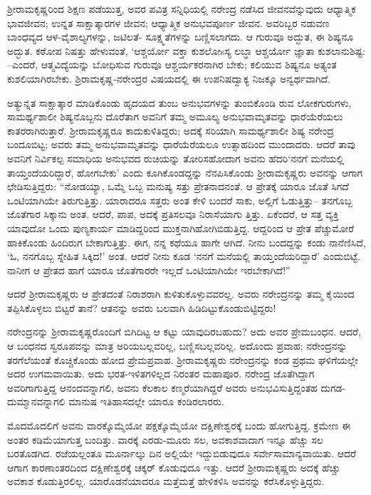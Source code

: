 ಶ್ರೀರಾಮಕೃಷ್ಣರಿಂದ ಶಿಕ್ಷಣ ಪಡೆಯುತ್ತ, ಅವರ ಪವಿತ್ರ ಸನ್ನಿಧಿಯಲ್ಲಿ ನರೇಂದ್ರ ನಡೆಸಿದ ಜೀವನವೆನ್ನುವುದು ಆಧ್ಯಾತ್ಮಿಕ ಭಾವಜೀವನ; ಉನ್ನತ ಸಾಕ್ಷಾತ್ಕಾರಗಳ ಜೀವನ; ಆಧ್ಯಾತ್ಮಿಕ ಅನುಭವಪೂರ್ಣ ಜೀವನ. ಅವರಿಬ್ಬರ ನಡುವಣ ಬಾಂಧವ್ಯದ ಆಳ-ವೈಶಾಲ್ಯಗಳನ್ನು, ಜಟಿಲತೆ- ಸೂಕ್ಷ್ಮತೆಗಳನ್ನು ಬಣ್ಣಿಸಲಾಗದು. ಆ ಗುರುವೂ ಅದ್ಭುತ, ಈ ಶಿಷ್ಯನೂ ಅದ್ಭುತ. ಕಠೋಪ ನಿಷತ್ತು ಹೇಳುವಂತೆ, ‘ಆಶ್ಚರ್ಯೋ ವಕ್ತಾ ಕುಶಲೋsಸ್ಯ ಲಬ್ಧಾ ಆಶ್ಚರ್ಯೋ ಜ್ಞಾತಾ ಕುಶಲಾನುಶಿಷ್ಟ: –ಎಂದರೆ, ಆತ್ಮವಿದ್ಯೆಯನ್ನು ಬೋಧಿಸುವ ಗುರುವೂ ಆಶ್ಚರ್ಯಕರನಾಗಿರ ಬೇಕು; ಕಲಿಯುವ ಶಿಷ್ಯನೂ ಅತ್ಯಂತ ಕುಶಲಿಯಾಗಿರಬೇಕು. ಶ್ರಿರಾಮಕೃಷ್ಣ-ನರೇಂದ್ರರ ವಿಷಯದಲ್ಲಿ ಈ ಉಪನಿಷದ್ವಾಕ್ಯ ನಿಜಕ್ಕೂ ಅನ್ವರ್ಥವಾಗಿದೆ.

ಅತ್ಯುನ್ನತ ಸಾಕ್ಷಾತ್ಕಾರ ಮಾಡಿಕೊಂಡು ಹೃದಯದ ತುಂಬ ಅನುಭವಗಳನ್ನು ತುಂಬಿಕೊಂಡಿ ರುವ ಲೋಕಗುರುಗಳು, ಸಾಮರ್ಥ್ಯಶಾಲೀ ಶಿಷ್ಯನೊಬ್ಬನು ದೊರೆತಾಗ ಅವನಿಗೆ ತಮ್ಮ ಅಮೂಲ್ಯ ಅನುಭವಾಮೃತವನ್ನು ಧಾರೆಯೆರೆಯಲು ಕಾತರರಾಗಿರುತ್ತಾರೆ. ಶ್ರೀರಾಮಕೃಷ್ಣರೂ ಕಾದುಕುಳಿತಿದ್ದರು; ಅದಕ್ಕೆ ಸರಿಯಾಗಿ ಸಾಮರ್ಥ್ಯಶಾಲೀ ಶಿಷ್ಯ ನರೇಂದ್ರ ಬಂದೂಬಿಟ್ಟ; ಅವರು ತಮ್ಮ ಅನುಭವಾಮೃತವನ್ನು ಧಾರೆಯೆರೆಯಲೂ ಉತ್ಸಾಹದಿಂದ ಮುಂದಾದರು. ಆದರೆ ತಾವು ಅವನಿಗೆ ನಿರ್ವಿಕಲ್ಪ ಸಮಾಧಿಯ ಅನುಭವದ ರುಚಿಯನ್ನು ತೋರಿಸಹೋದಾಗ ಅವನು ಹೆದರಿ‘ನನಗೆ ಮನೆಯಲ್ಲಿ ತಾಯ್ತಂದೆಯರಿದ್ದಾರೆ, ಹೋಗಬೇಕು’ ಎಂದು ಕೂಗಿಕೊಂಡದ್ದನ್ನು ನೆನಪಿಸಿಕೊಂಡು ಶ್ರೀರಾಮಕೃಷ್ಣರು ಅವನನ್ನು ಆಗಾಗ ಛೇಡಿಸುತ್ತಿದ್ದರು: “ನೋಡಯ್ಯಾ, ಒಮ್ಮೆ ಒಬ್ಬ ಮನುಷ್ಯ ಸತ್ತು ಪ್ರೇತನಾದನಂತೆ. ಆ ಪ್ರೇತಕ್ಕೆ ಯಾರೂ ಜೊತೆ ಸಿಗದೆ ಒಂಟಿಯಾಗಿಯೇ ತಿರುಗುತ್ತಿತ್ತು. ಯಾರಾದರೂ ಸತ್ತರು ಅಂತ ಕೇಳಿ ಬಂದರೆ ಸಾಕು, ಅಲ್ಲಿಗೆ ಓಡುತ್ತಿತ್ತು– ತನಗೊಬ್ಬ ಜೊತೆಗಾರ ಸಿಕ್ಕಾನು ಅಂತ. ಆದರೆ, ಪಾಪ, ಅದಕ್ಕೆ ಪ್ರತಿಸಲವೂ ನಿರಾಸೆಯಾಗು ತ್ತಿತ್ತು. ಏಕೆಂದರೆ, ಆ ಸತ್ತ ವ್ಯಕ್ತಿ ಯಾವುದೋ ಒಂದು ಪುಣ್ಯಕಾರ್ಯ ಮಾಡಿದ್ದರಿಂದ ಮುಕ್ತನಾಗಿಹೋಗಿಬಿಡುತ್ತಿದ್ದ. ಆದ್ದರಿಂದ ಆ ಪ್ರೇತ ಪೆಚ್ಚುಮೋರೆ ಹಾಕಿಕೊಂಡು ಹಿಂದಿರುಗ ಬೇಕಾಗುತ್ತಿತ್ತು. ಈಗ, ನನ್ನ ಕಥೆಯೂ ಹಾಗೇ ಆಗಿದೆ. ನೀನು ಬಂದದ್ದನ್ನು ಕಂಡು ನಾನೆಣಿಸಿದೆ, ‘ಓ, ನನಗೊಬ್ಬ ಸ್ನೇಹಿತ ಸಿಕ್ಕಿದ!’ ಅಂತ. ಆದರೆ ನೀನು ಕೂಡ ‘ನನಗೆ ಮನೆಯಲ್ಲಿ ತಾಯ್ತಂದೆಯರಿದ್ದಾರೆ’ ಎಂದುಬಿಟ್ಟೆ. ನಾನೀಗ ಆ ಪ್ರೇತದ ಹಾಗೆ ಯಾರೂ ಜೊತೆಗಾರರೇ ಇಲ್ಲದೆ ಒಂಟಿಯಾಗಿಯೇ ಇರಬೇಕಾಗಿದೆ!”

ಆದರೆ ಶ್ರೀರಾಮಕೃಷ್ಣರು ಆ ಪ್ರೇತದಂತೆ ನಿರಾಶರಾಗಿ ಕುಳಿತುಕೊಳ್ಳುವವರಲ್ಲ. ಅವರು ನರೇಂದ್ರನನ್ನು ತಮ್ಮ ಕೈಯಿಂದ ತಪ್ಪಿಸಿಕೊಳ್ಳಲು ಬಿಟ್ಟರೆ ತಾನೆ? ಆತನನ್ನು ಅವರು ಬಲವಾಗಿ ಹಿಡಿದಿಟ್ಟುಕೊಂಡುಬಿಟ್ಟಿದ್ದರು!

ನರೇಂದ್ರನನ್ನು ಶ್ರೀರಾಮಕೃಷ್ಣರೊಂದಿಗೆ ಬಿಗಿದಿಟ್ಟ ಆ ಕಟ್ಟು ಯಾವುದಿರಬಹುದು? ಅದು ಅವರ ಪ್ರೇಮಬಂಧನ. ಆದರೆ, ಆ ಬಂಧನದ ಸ್ವರೂಪವನ್ನು ಮಾತ್ರ ಅರಿಯಬಲ್ಲವರಿಲ್ಲ, ಬಣ್ಣಿಸಬಲ್ಲವರಿಲ್ಲ. ಅದೊಂದು ಪ್ರವಾಹ; ನರೇಂದ್ರನನ್ನು ತರಗೆಲೆಯಂತೆ ಕೊಚ್ಚಿಕೊಂಡು ಹೋದ ಪ್ರೇಮಪ್ರವಾಹ. ಶ್ರೀರಾಮಕೃಷ್ಣರು ನರೇಂದ್ರನನ್ನು ಕಂಡ ಪ್ರಥಮ ಘಳಿಗೆಯಲ್ಲೇ ಅದರ ಉಗಮವಾಯಿತು. ಅದು ಭರತ-ಇಳಿತಗಳಿಲ್ಲದ ನಿರಂತರ ಮಹಾಪೂರ. ನರೇಂದ್ರ ಜೊತೆಗಿದ್ದಾಗ ಅವರಿಗಾಗುತ್ತಿದ್ದ ಆನಂದವನ್ನಾಗಲಿ, ಅವನು ಕೆಲಕಾಲ ಕಣ್ಮರೆಯಾಗಿದ್ದರೆ ಅವರು ಅನುಭವಿಸುತ್ತಿದ್ದಂತಹ ದುಗಡ-ದುಮ್ಮಾನವನ್ನಾಗಲಿ ಮಾನುಷ ಇತಿಹಾಸದಲ್ಲೇ ಯಾರೂ ಕಂಡಿರಲಾರರು.

ಮೊದಮೊದಲಿಗೆ ಅವನು ವಾರಕ್ಕೊಮ್ಮೆಯೋ ಪಕ್ಷಕ್ಕೊಮ್ಮೆಯೋ ದಕ್ಷಿಣೇಶ್ವರಕ್ಕೆ ಬಂದು ಹೋಗುತ್ತಿದ್ದ. ಕ್ರಮೇಣ ಈ ಅಂತರ ಕಡಿಮೆಯಾಗುತ್ತ ಬಂದಿತ್ತು. ವಾರಕ್ಕೆ ಎರಡು-ಮೂರು ಸಲ, ಅವಕಾಶವಾದಾಗ ಇನ್ನೂ ಹೆಚ್ಚು ಸಲ ಬರತೊಡಗಿದ. ರಜೆಯಲ್ಲಂತೂ ಮೂರ್ನಾಲ್ಕು ದಿನ ಅಲ್ಲಿಯೇ ಇದ್ದುಬಿಡುವುದೂ ಸರ್ವೇಸಾಮಾನ್ಯವಾಯಿತು. ಆದರೆ ಆಗಾಗ ಕಾರಣಾಂತರದಿಂದ ದಕ್ಷಿಣೇಶ್ವರಕ್ಕೆ ಚಕ್ಕರ್ ಕೊಡುವುದೂ ಇತ್ತು. ಆದರೆ ಶ್ರೀರಾಮಕೃಷ್ಣರು ಅದಕ್ಕೆ ಹೆಚ್ಚು ಅವಕಾಶ ಕೊಡುತ್ತಿರಲಿಲ್ಲ. ಯಾರೊಡನೆಯಾದರೂ ಮತ್ತೆಮತ್ತೆ ಹೇಳಿಕಳಿಸಿ ಅವನನ್ನು ಕರೆಸಿಕೊಳ್ಳುತ್ತಿದ್ದರು.

